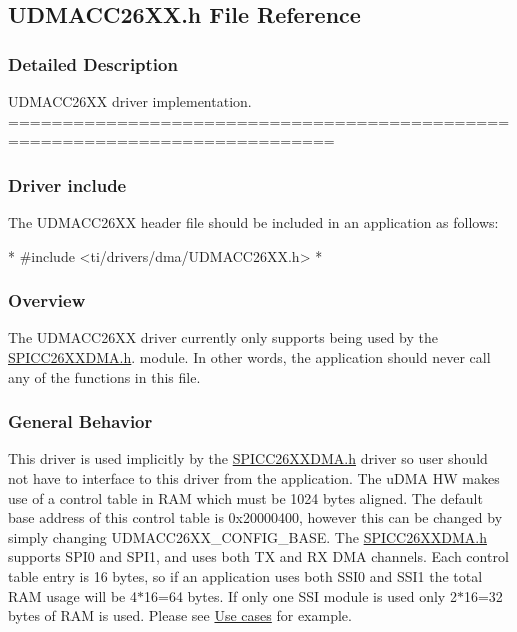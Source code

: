 \subsection{U\-D\-M\-A\-C\-C26\-X\-X.\-h File Reference}
\label{_u_d_m_a_c_c26_x_x_8h}


\subsubsection{Detailed Description}
U\-D\-M\-A\-C\-C26\-X\-X driver implementation. ============================================================================

\subsubsection*{Driver include}

The U\-D\-M\-A\-C\-C26\-X\-X header file should be included in an application as follows\-: 
\begin{DoxyCode}
*  #include <ti/drivers/dma/UDMACC26XX.h>
*  
\end{DoxyCode}


\subsubsection*{Overview}

The U\-D\-M\-A\-C\-C26\-X\-X driver currently only supports being used by the \hyperlink{_s_p_i_c_c26_x_x_d_m_a_8h}{S\-P\-I\-C\-C26\-X\-X\-D\-M\-A.\-h}. module. In other words, the application should never call any of the functions in this file.

\subsubsection*{General Behavior}

This driver is used implicitly by the \hyperlink{_s_p_i_c_c26_x_x_d_m_a_8h}{S\-P\-I\-C\-C26\-X\-X\-D\-M\-A.\-h} driver so user should not have to interface to this driver from the application. The u\-D\-M\-A H\-W makes use of a control table in R\-A\-M which must be 1024 bytes aligned. The default base address of this control table is 0x20000400, however this can be changed by simply changing U\-D\-M\-A\-C\-C26\-X\-X\-\_\-\-C\-O\-N\-F\-I\-G\-\_\-\-B\-A\-S\-E. The \hyperlink{_s_p_i_c_c26_x_x_d_m_a_8h}{S\-P\-I\-C\-C26\-X\-X\-D\-M\-A.\-h} supports S\-P\-I0 and S\-P\-I1, and uses both T\-X and R\-X D\-M\-A channels. Each control table entry is 16 bytes, so if an application uses both S\-S\-I0 and S\-S\-I1 the total R\-A\-M usage will be 4$\ast$16=64 bytes. If only one S\-S\-I module is used only 2$\ast$16=32 bytes of R\-A\-M is used. Please see \hyperlink{_u_d_m_a_c_c26_x_x_8h_USE_CASE}{Use cases} for example.

